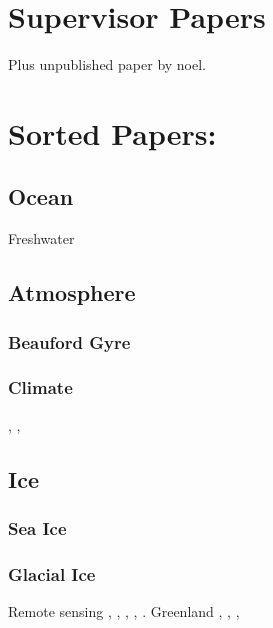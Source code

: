 \section*{Supervisor Papers}
\cite{Moon2018}
\citep{Gourmelen2018}
\citep{Foresta2016}
\citep{Tsamados}
Plus unpublished paper by noel.

\section*{Sorted Papers:}

\subsection*{Ocean}
\cite{Osterhus2019}

Freshwater \cite{Schauer2019}

\subsection*{Atmosphere}
\subsubsection{Beauford Gyre}
\cite{Zhang2016}
\subsubsection{Climate}
\citep{Ades2019}, \cite{Nakamura2016}, \cite{Coumou2018}
\subsection*{Ice}
\subsubsection*{Sea Ice}
\citep{Stroeve2018}
\cite{Kwok2018}
\cite{Guemas2016}
\subsubsection*{Glacial Ice}
Remote sensing \citep{McMillan2018} , \cite{Siegfried2014}, \citep{Moyer2017}, \cite{Simonsen2017}, \cite{Nilsson2016}.
Greenland \citep{Tedstone2015}
\citep{Weissgerber2017}, \cite{Williams2020}, \citep{Igneczi2016}, \citep{Sandberg2018}